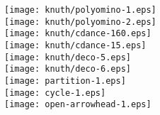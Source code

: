 \documentclass{article}
\begin{document}
\texttt{[image: knuth/polyomino-1.eps]}
\\[2in]
\texttt{[image: knuth/polyomino-2.eps]}
\\[2in]
\texttt{[image: knuth/cdance-160.eps]}
\\[2in]
\texttt{[image: knuth/cdance-15.eps]}
\\[2in]
\texttt{[image: knuth/deco-5.eps]}
\\[2in]
\texttt{[image: knuth/deco-6.eps]}
\\[2in]
\texttt{[image: partition-1.eps]}
\\[2in]
\texttt{[image: cycle-1.eps]}
\\[2in]
\texttt{[image: open-arrowhead-1.eps]}
\end{document}
